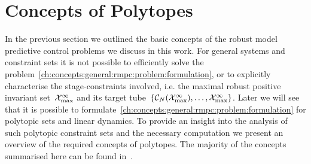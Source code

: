 \resetcounters
\chapter{Concepts of Polytopes}\label{ch:concepts:sec:polytopes}
%
%
%
%
In the previous section we outlined the basic concepts of the robust model predictive control problems we discuss in this work.
%
For general systems and constraint sets it is not possible to efficiently solve the problem~\eqref{ch:concepts:general:rmpc:problem:formulation}, or to explicitly characterise the stage-constraints involved, i.e. the maximal robust positive invariant set~$\mathcal X^\infty_{\max}$ and its target tube~$\{\mathcal C_N(\mathcal X^\infty_{\max}),\dots,\mathcal X^\infty_{\max}\}$.
%
Later we will see that it is possible to formulate~\eqref{ch:concepts:general:rmpc:problem:formulation} for polytopic sets and linear dynamics.
%
To provide an insight into the analysis of such polytopic constraint sets and the necessary computation we present an overview of the required concepts of polytopes.
%
The majority of the concepts summarised here can be found in~\cite{Ziegler:1995,Gruenbaum:1967,Hadwiger:1957}.
%
%
%
%
